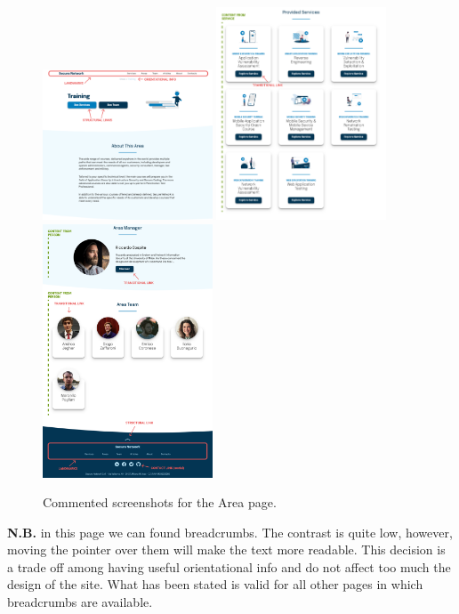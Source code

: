 \documentclass[12pt]{report}
\begin{document}
\begin{figure}[H]
	\centering
	\includegraphics[width=0.45\textwidth]{high_fid_wireframes/area/1.png}
	\includegraphics[width=0.45\textwidth]{high_fid_wireframes/area/2.png}
	\includegraphics[width=0.45\textwidth]{high_fid_wireframes/area/3.png}
	\caption{Commented screenshots for the Area page.}
\end{figure}
\textbf{N.B.} in this page we can found breadcrumbs. The contrast is quite low,
however, moving the pointer over them will make the text more readable. This 
decision is a trade off among having useful orientational info and do not affect
too much the design of the site. What has been stated is valid for all other pages
in which breadcrumbs are available.
\end{document}
